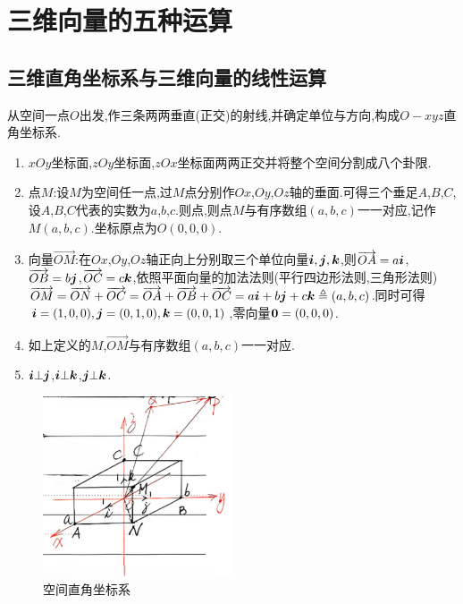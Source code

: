 \setcounter{chapter}{0}
\chapter{三维向量的五种运算}

\section{三维直角坐标系与三维向量的线性运算}

\begin{definition}[空间直角坐标系]
    从空间一点$O$出发,作三条两两垂直(正交)的射线,并确定单位与方向,构成$O-xyz$直角坐标系.
\end{definition}


\begin{proposition}
    \begin{enumerate}
        \item $xOy$坐标面,$zOy$坐标面,$zOx$坐标面两两正交并将整个空间分割成八个卦限.
        \item 点$M$:设$M$为空间任一点,过$M$点分别作$Ox$,$Oy$,$Oz$轴的垂面.可得三个垂足$A$,$B$,$C$,设$A$,$B$,$C$代表的实数为$a$,$b$,$c$.则点,则点$M$与有序数组$(a,b,c)$一一对应,记作$M(a,b,c)$.坐标原点为$O(0,0,0)$.
        \item 向量$\overrightarrow{OM}$:在$Ox$,$Oy$,$Oz$轴正向上分别取三个单位向量$\bm{i},\bm{j},\bm{k}$,则$\overrightarrow{OA}=a\bm{i}$, $\overrightarrow{OB}=b\bm{j}$,$\overrightarrow{OC}=c\bm{k}$,依照平面向量的加法法则(平行四边形法则,三角形法则)$\overrightarrow{OM}=\overrightarrow{ON}+\overrightarrow{OC}=\overrightarrow{OA}+\overrightarrow{OB}+\overrightarrow{OC}=a\bm{i}+b\bm{j}+c\bm{k}\triangleq(a,b,c)$.同时可得$\bm{i}=(1,0,0),\bm{j}=(0,1,0),\bm{k}=(0,0,1)$,零向量$\bm{0}=(0,0,0)$.
        \item 如上定义的$M$,$\overrightarrow{OM}$与有序数组$(a,b,c)$一一对应.
        \item $\bm{i}\bot\bm{j}$,$\bm{i}\bot\bm{k}$,$\bm{j}\bot\bm{k}$.
    \end{enumerate}

\end{proposition}

\begin{figure}[h]
    \centering
    \includegraphics[width=0.5\textwidth]{figure/1-1空间直角坐标系.png}
    \caption{空间直角坐标系}
    \label{fig:fig1}
\end{figure}

